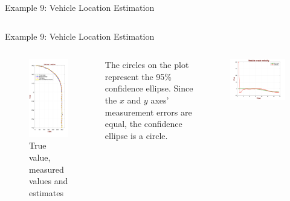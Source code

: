 \begin{frame}{Example 9: Vehicle Location Estimation}
\begin{columns}
\end{columns}
\end{frame}

\begin{frame}{Example 9: Vehicle Location Estimation}
\begin{columns}
\vspace{-20pt}
\begin{figure}
    \centering
    \includegraphics[width=0.5\linewidth]{Figures//Chapter3/KF_VehiclePositionEstimation.png}
    \vspace{-20pt}
    \caption{True value, measured values and estimates}
    \label{fig:KF_VehiclePositionEstimation}
\end{figure}
The circles on the plot represent the 95\% confidence ellipse. Since the $x$ and $y$ axes’
measurement errors are equal, the confidence ellipse is a circle.
\vspace{-15pt}
\begin{figure}
    \centering
    \includegraphics[width=0.9\linewidth]{Figures//Chapter3/Ex9_x_velcity.png}

\end{figure}
\end{columns}
\end{frame}
